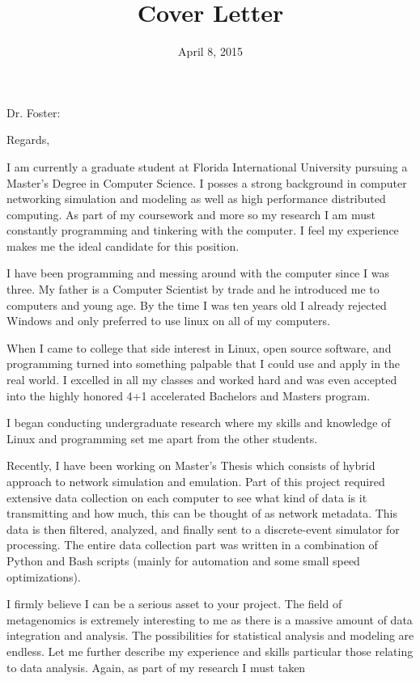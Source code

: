 \documentclass[11pt,a4paper,sans]{moderncv}        %
\title{Cover Letter}                               %
\begin{document}
\date{April 8, 2015}
\opening{Dr. Foster:}
\closing{Regards,}
\makelettertitle

I am currently a graduate student at Florida International University pursuing a Master's
Degree in Computer Science. I posses a strong background in computer networking simulation and
modeling as well as high performance distributed computing. As part of my coursework and more
so my research I am must constantly programming and tinkering with the computer. I feel my
experience makes me the ideal candidate for this position.

I have been programming and messing around with the computer since I was three. My father is a
Computer Scientist by trade and he introduced me to computers and young age. By the time I was
ten years old I already rejected Windows and only preferred to use linux on all of my
computers.

When I came to college that side interest in Linux, open source software, and programming
turned into something palpable that I could use and apply in the real world. I excelled in all
my classes and worked hard and was even accepted into the highly honored 4+1 accelerated
Bachelors and Masters program. 

I began conducting undergraduate research where my skills and knowledge of Linux and
programming set me apart from the other students. 

Recently, I have been working on Master's Thesis which consists of hybrid approach to network
simulation and emulation. Part of this project required extensive data collection on each
computer to see what kind of data is it transmitting and how much, this can be thought of as
network metadata. This data is then filtered, analyzed, and finally sent to a discrete-event 
simulator for processing. The entire data collection part was written in a combination of 
Python and Bash scripts (mainly for automation and some small speed optimizations).

I firmly believe I can be a serious asset to your project. The field of metagenomics is
extremely interesting to me as there is a massive amount of data integration and analysis. The
possibilities for statistical analysis and modeling are endless. Let me further describe my
experience and skills particular those relating to data analysis. Again, as part of my research
I must taken
\end{document}
